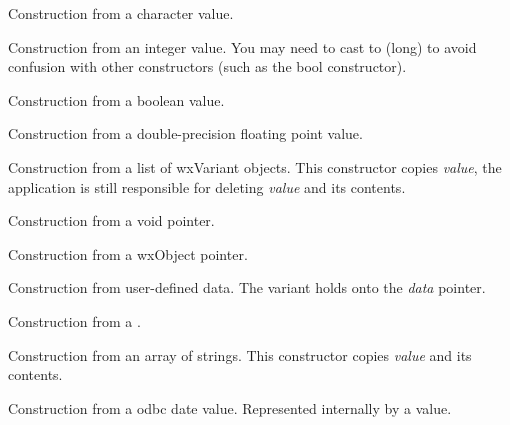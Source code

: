 
Construction from a character value.


Construction from an integer value. You may need to cast to (long) to
avoid confusion with other constructors (such as the bool constructor).


Construction from a boolean value.


Construction from a double-precision floating point value.


Construction from a list of wxVariant objects. This constructor
copies {\it value}, the application is still responsible for
deleting {\it value} and its contents.


Construction from a void pointer.


Construction from a wxObject pointer.


Construction from user-defined data.  The variant holds onto the {\it data} pointer.


Construction from a .


Construction from an array of strings.  This constructor copies {\it value} and its contents.


Construction from a odbc date value.  Represented internally by a  value.

